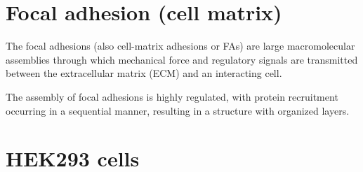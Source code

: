 % 


\section{Focal adhesion (cell matrix)}
\label{sec:focal-adhesion}

The focal adhesions (also cell-matrix adhesions or FAs) are large macromolecular
assemblies through which mechanical force and regulatory signals are transmitted
between the extracellular matrix (ECM) and an interacting cell.

The assembly of focal adhesions is highly regulated, with protein recruitment
occurring in a sequential manner, resulting in a structure with organized
layers.

\section{HEK293 cells}
\label{sec:HEK293-cell}

